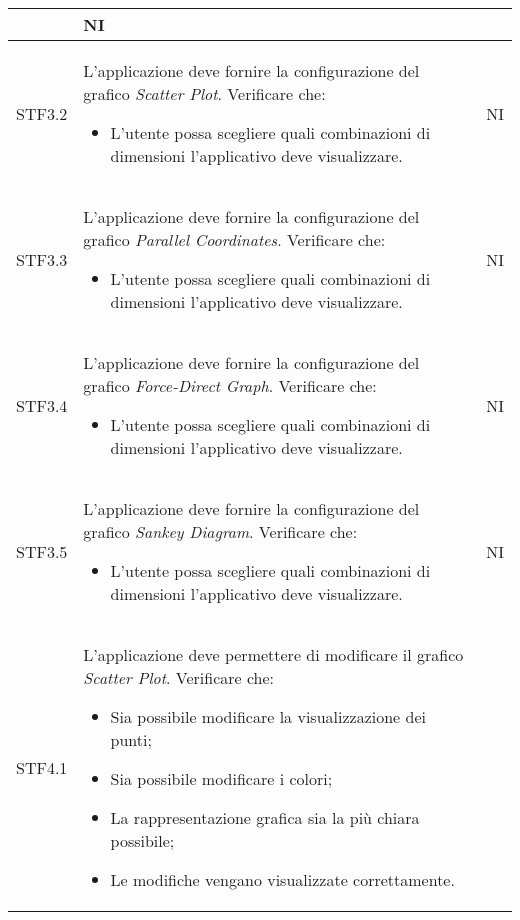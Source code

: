 \begin{center}
\begin{longtable}{|p{1.5cm}|p{11cm}|p{1cm}|}
\begin{itemize}
        \end{itemize} & NI\\ \hline
        \rowcolor[HTML]{C0C0C0}
        STF3.2 & L'applicazione deve fornire la configurazione del grafico \textit{Scatter Plot}. Verificare che: \begin{itemize}
            \item L'utente possa scegliere quali combinazioni di dimensioni l'applicativo deve visualizzare.
        \end{itemize} & NI\\ \hline
        \rowcolor[HTML]{EFEFEF}
        STF3.3 & L'applicazione deve fornire la configurazione del grafico \textit{Parallel Coordinates}. Verificare che: \begin{itemize}
            \item L'utente possa scegliere quali combinazioni di dimensioni l'applicativo deve visualizzare.
        \end{itemize} & NI\\ \hline
        \rowcolor[HTML]{C0C0C0}
        STF3.4 & L'applicazione deve fornire la configurazione del grafico \textit{Force-Direct Graph}. Verificare che: \begin{itemize}
            \item L'utente possa scegliere quali combinazioni di dimensioni l'applicativo deve visualizzare.
        \end{itemize} & NI\\ \hline
        \rowcolor[HTML]{EFEFEF}
        STF3.5 & L'applicazione deve fornire la configurazione del grafico \textit{Sankey Diagram}. Verificare che: \begin{itemize}
            \item L'utente possa scegliere quali combinazioni di dimensioni l'applicativo deve visualizzare.
        \end{itemize} & NI\\ \hline
        \rowcolor[HTML]{C0C0C0}
        STF4.1 & L'applicazione deve permettere di modificare il grafico \textit{Scatter Plot}. Verificare che: \begin{itemize}
            \item Sia possibile modificare la visualizzazione dei punti;
            \item Sia possibile modificare i colori;
            \item La rappresentazione grafica sia la più chiara possibile;
            \item Le modifiche vengano visualizzate correttamente.

\end{itemize}
\end{longtable}
\end{center}
